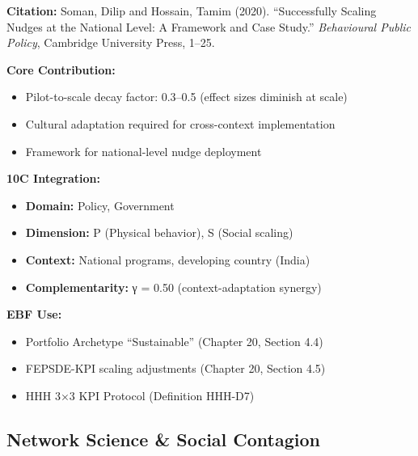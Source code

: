 \begin{tcolorbox}[colback=yellow!5!white,colframe=yellow!75!black,title=Key Paper: Soman \& Hossain (2020)]
\textbf{Citation:} Soman, Dilip and Hossain, Tamim (2020). ``Successfully Scaling Nudges at the National Level: A Framework and Case Study.'' \textit{Behavioural Public Policy}, Cambridge University Press, 1--25.

\textbf{Core Contribution:}
\begin{itemize}[nosep]
    \item Pilot-to-scale decay factor: 0.3--0.5 (effect sizes diminish at scale)
    \item Cultural adaptation required for cross-context implementation
    \item Framework for national-level nudge deployment
\end{itemize}

\textbf{10C Integration:}
\begin{itemize}[nosep]
    \item \textbf{Domain:} Policy, Government
    \item \textbf{Dimension:} P (Physical behavior), S (Social scaling)
    \item \textbf{Context:} National programs, developing country (India)
    \item \textbf{Complementarity:} γ = 0.50 (context-adaptation synergy)
\end{itemize}

\textbf{EBF Use:}
\begin{itemize}[nosep]
    \item Portfolio Archetype ``Sustainable'' (Chapter 20, Section 4.4)
    \item FEPSDE-KPI scaling adjustments (Chapter 20, Section 4.5)
    \item HHH 3×3 KPI Protocol (Definition HHH-D7)
\end{itemize}
\end{tcolorbox}


\subsection{Network Science \& Social Contagion}
\label{subsec:ot-network-science}


